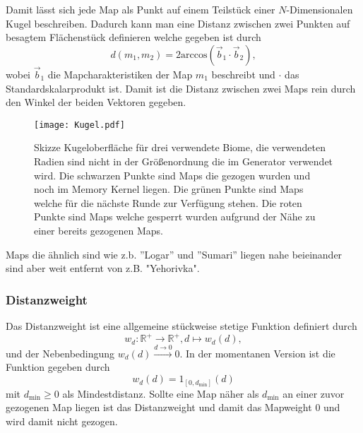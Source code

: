             Damit lässt sich jede Map als Punkt auf einem Teilstück einer $N$-Dimensionalen Kugel beschreiben. 
            Dadurch kann man eine Distanz zwischen zwei Punkten auf besagtem Flächenstück definieren welche gegeben ist durch 
            \begin{equation}
                d(m_1, m_2) = 2\text{arccos}(\vec{b}_1\cdot\vec{b}_2),
            \end{equation}
            wobei $\vec{b}_1$ die Mapcharakteristiken der Map $m_1$ beschreibt und $\cdot$ das Standardskalarprodukt ist.
            Damit ist die Distanz zwischen zwei Maps rein durch den Winkel der beiden Vektoren gegeben. 
            \begin{figure}[htbp]
                \centering
                \texttt{[image: Kugel.pdf]}
                \caption{Skizze Kugeloberfläche für drei verwendete Biome, die verwendeten Radien sind nicht in der Größenordnung die im Generator verwendet wird. 
                            Die schwarzen Punkte sind Maps die gezogen wurden und noch im Memory Kernel liegen. 
                            Die grünen Punkte sind Maps welche für die nächste Runde zur Verfügung stehen.
                            Die roten Punkte sind Maps welche gesperrt wurden aufgrund der Nähe zu einer bereits gezogenen Maps.}
            \end{figure}
            Maps die ähnlich sind wie z.b. ''Logar'' und ''Sumari'' liegen nahe beieinander sind aber weit entfernt von z.B. "Yehorivka".
        \subsubsection{Distanzweight}
            Das Distanzweight ist eine allgemeine stückweise stetige Funktion definiert durch
            \begin{equation}
                w_d : \mathbb{R}^+ \rightarrow \mathbb{R}^+, d \mapsto w_d(d),
            \end{equation}
            und der Nebenbedingung $w_d(d)\overset{d\rightarrow 0}{\longrightarrow}0$.
            In der momentanen Version ist die Funktion gegeben durch
            \begin{equation}
                w_d(d) = 1_{[0,d_\text{min}]}(d)
            \end{equation}
            mit $d_\text{min}\geq 0$ als Mindestdistanz. 
            Sollte eine Map näher als $d_\text{min}$ an einer zuvor gezogenen Map liegen ist das Distanzweight und damit das Mapweight $0$ und wird damit nicht gezogen.        
